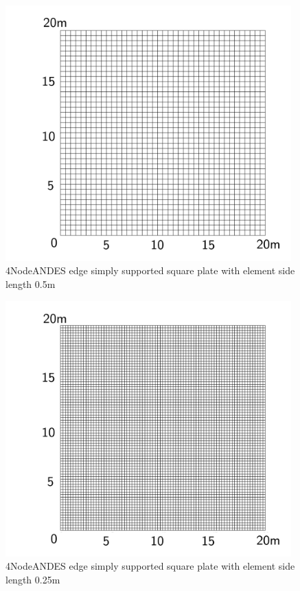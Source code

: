 \documentclass[fleqn,11pt]{article}
\begin{document}
\begin{figure}[H]
  \centering
  \includegraphics[width=11cm]{../Figure-files/square_plate5.pdf}
  \caption{4NodeANDES edge simply supported square plate with element side length 0.5m }
  \label{fig 4NodeANDES edges simply supported square plate with element side length 0.5m }
\end{figure}

\newpage

\begin{figure}[H]
  \centering
  \includegraphics[width=11cm]{../Figure-files/square_plate6.pdf}
  \caption{4NodeANDES edge simply supported square plate with element side length 0.25m }
  \label{fig 4NodeANDES edges simply supported square plate with element side length 0.25m }
\end{figure}
\end{document}
